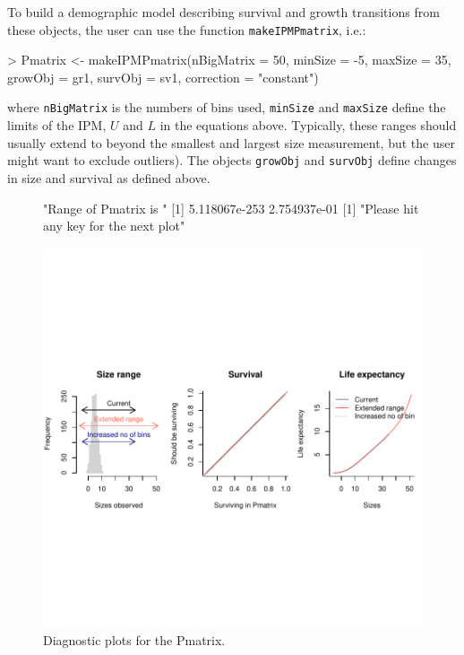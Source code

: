 \documentclass{article}
\begin{document}
To build a demographic model describing survival and growth transitions from these objects, the user can use the function {\tt makeIPMPmatrix}, i.e.: 
\begin{Schunk}
\begin{Sinput}
> Pmatrix <- makeIPMPmatrix(nBigMatrix = 50, 
                              minSize = -5, maxSize = 35, 
                              growObj = gr1, survObj = sv1, 
                              correction = "constant")
\end{Sinput}
\end{Schunk}
where {\tt nBigMatrix} is the numbers of bins used, {\tt minSize} and
{\tt maxSize} define the limits of the IPM, $U$ and $L$ in the
equations above. Typically, these ranges should usually extend to beyond the
smallest and largest size measurement, but the user might want to exclude
outliers). The objects {\tt growObj} and {\tt survObj} define changes in size
and survival as defined above. 

\begin{figure}
\begin{center}
\begin{Schunk}
\begin{Soutput}
[1] "Range of Pmatrix is "
[1] 5.118067e-253  2.754937e-01
[1] "Please hit any key for the next plot"
\end{Soutput}
\end{Schunk}
\includegraphics{IPMpack_Vignette-triDiag}
\end{center}
\caption{Diagnostic plots for the Pmatrix.}
\label{fig:triDiag}
\end{figure}
\end{document}

